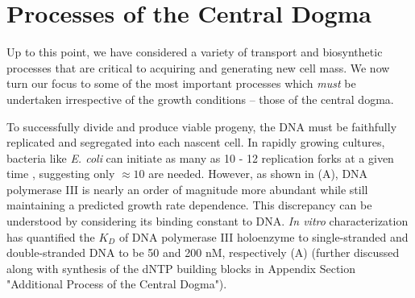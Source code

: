 \section{Processes of the Central Dogma}
Up to this point, we have considered a variety of transport and biosynthetic
processes that are critical to acquiring and generating new cell mass. We now
turn our focus to some of the most important processes which \textit{must} be
undertaken irrespective of the growth conditions -- those of the central dogma.

To successfully divide and produce viable progeny, the DNA must be
faithfully replicated and segregated into each nascent cell.
In rapidly growing cultures, bacteria like \textit{E. coli} can initiate as many
as 10 - 12 replication forks at a given time \citep{bremer2008, si2017},
suggesting  only $\approx 10$ are needed. However, as shown in
(A), DNA polymerase III is nearly an order of magnitude more
abundant while still maintaining a predicted growth rate dependence. This
discrepancy can be understood by considering its binding constant to DNA.
\textit{In vitro} characterization has quantified the $K_D$ of DNA polymerase
III holoenzyme to single-stranded and double-stranded DNA to be 50 and 200 nM,
respectively \citep{ason2000} (A) (further discussed
along with synthesis of the dNTP building blocks in Appendix Section "Additional Process of
the Central Dogma").

\begin{figure}
\end{figure}


